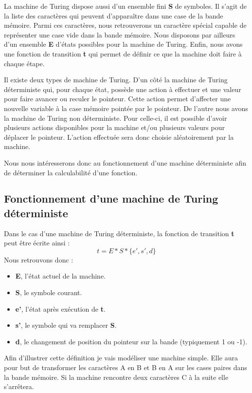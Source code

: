 \documentclass[12pt, twoside, openright]{report}
\begin{document}
La machine de Turing dispose aussi d'un ensemble fini \textbf{S} de symboles. Il s'agit de la liste des caractères qui peuvent d'apparaître dans une case de la bande mémoire. Parmi ces caractères, nous retrouverons un caractère spécial capable de représenter une case vide dans la bande mémoire. Nous disposons par ailleurs d'un ensemble \textbf{E} d'états possibles pour la machine de Turing. Enfin, nous avons une fonction de transition \textbf{t} qui permet de définir ce que la machine doit faire à chaque étape.

Il existe deux types de machine de Turing. D'un côté la machine de Turing déterministe qui, pour chaque état, possède une action à effectuer et une valeur pour faire avancer ou reculer le pointeur. Cette action permet d'affecter une nouvelle variable à la case mémoire pointée par le pointeur. De l'autre nous avons la machine de Turing non déterministe. Pour celle-ci, il est possible d'avoir plusieurs actions disponibles pour la machine et/ou plusieurs valeurs pour déplacer le pointeur. L'action effectuée sera donc choisie aléatoirement par la machine.

Nous nous intéresserons donc au fonctionnement d'une machine déterministe afin de déterminer la calculabilité d'une fonction. 

\subsection{Fonctionnement d'une machine de Turing déterministe}

Dans le cas d'une machine de Turing déterministe, la fonction de transition \textbf{t} peut être écrite ainsi : 
\[t = E * S * \{e', s', d\}\]
Nous retrouvons donc :
\begin{itemize}
    \item \textbf{E}, l'état actuel de la machine.
    \item \textbf{S}, le symbole courant.
    \item \textbf{e'}, l'état après exécution de \textbf{t}.
    \item \textbf{s'}, le symbole qui va remplacer \textbf{S}.
    \item \textbf{d}, le changement de position du pointeur sur la bande (typiquement 1 ou -1).
\end{itemize}
\vspace{0.4cm}


Afin d'illustrer cette définition je vais modéliser une machine simple. Elle aura pour but de transformer les caractères A en B et B en A sur les cases paires dans la bande mémoire. Si la machine rencontre deux caractères C à la suite elle s'arrêtera.
\end{document}
